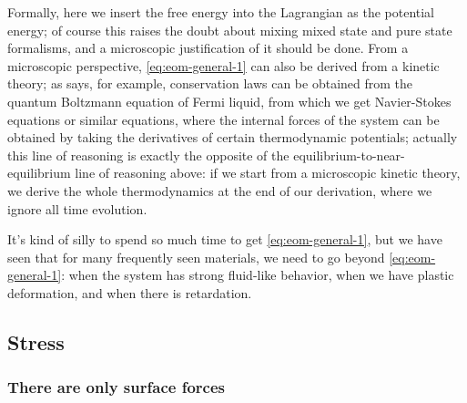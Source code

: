 \documentclass[hyperref, a4paper]{article}
\begin{document}
Formally, here we insert the free energy into the Lagrangian
as the potential energy;
of course this raises the doubt about 
mixing mixed state and pure state formalisms,
and a microscopic justification of it should be done.
From a microscopic perspective, 
\eqref{eq:eom-general-1} can also be derived from a kinetic theory; 
as \cite{belitz2022soft} says, for example, 
conservation laws can be obtained from the quantum Boltzmann equation of Fermi liquid,
from which we get Navier-Stokes equations
or similar equations,
where the internal forces of the system 
can be obtained by taking the derivatives of certain thermodynamic potentials;
actually this line of reasoning is exactly 
the opposite of the equilibrium-to-near-equilibrium line of reasoning above: 
if we start from a microscopic kinetic theory, 
we derive the whole thermodynamics 
at the end of our derivation,
where we ignore all time evolution.

It's kind of silly to spend so much time 
to get \eqref{eq:eom-general-1},
but we have seen that for many frequently seen materials,
we need to go beyond \eqref{eq:eom-general-1}:
when the system has strong fluid-like behavior,
when we have plastic deformation,
and when there is retardation.

\subsection{Stress}

\subsubsection{There are only surface forces}
\end{document}
